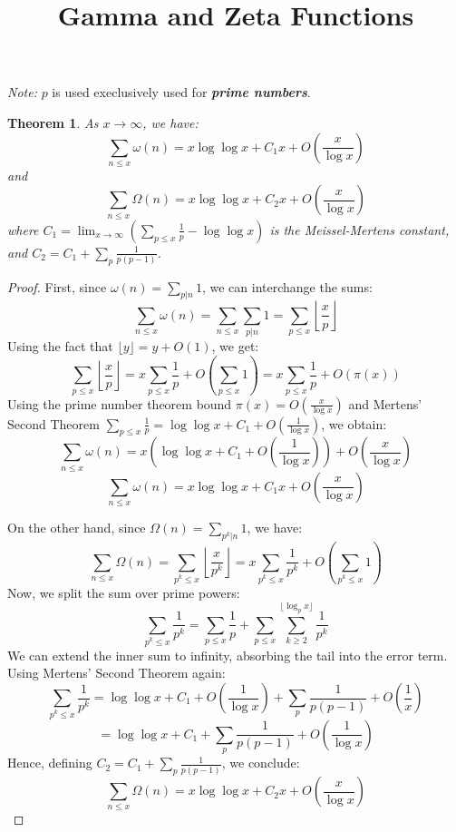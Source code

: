 \documentclass[a4paper,11pt]{article}
\title{Gamma and Zeta Functions}
\author{}
\date{}
\newtheorem{theorem}{Theorem}
\begin{document}
\maketitle

\textit{Note:} $p$ is used execlusively used for
\textit{\textbf{prime numbers}}.

\begin{theorem}
  As $x \to \infty$, we have:
  \[ \sum_{n \le x} \omega(n) = x \log \log x + C_1 x +
  O\left(\frac{x}{\log x}\right) \]
  and
  \[ \sum_{n \le x} \Omega(n) = x \log \log x + C_2 x +
  O\left(\frac{x}{\log x}\right) \]
  where $C_1 = \lim_{x \to \infty} \left( \sum_{p \le x} \frac{1}{p}
  - \log \log x \right)$ is the Meissel-Mertens constant, and $C_2 =
  C_1 + \sum_{p} \frac{1}{p(p-1)}$.
\end{theorem}

\begin{proof}
  First, since $\omega(n) = \sum_{p|n} 1$, we can interchange the sums:
  \[ \sum_{n \le x} \omega(n) = \sum_{n \le x} \sum_{p|n} 1 = \sum_{p
  \le x} \left\lfloor \frac{x}{p} \right\rfloor \]
  Using the fact that $\lfloor y \rfloor = y + O(1)$, we get:
  \[ \sum_{p \le x} \left\lfloor \frac{x}{p} \right\rfloor = x
    \sum_{p \le x} \frac{1}{p} + O\left(\sum_{p \le x} 1\right) = x
  \sum_{p \le x} \frac{1}{p} + O(\pi(x)) \]
  Using the prime number theorem bound $\pi(x) = O\left(\frac{x}{\log
  x}\right)$ and Mertens' Second Theorem $\sum_{p \le x} \frac{1}{p}
  = \log \log x + C_1 + O\left(\frac{1}{\log x}\right)$, we obtain:
  \[ \sum_{n \le x} \omega(n) = x \left( \log \log x + C_1 +
  O\left(\frac{1}{\log x}\right) \right) + O\left(\frac{x}{\log x}\right) \]
  \[ \sum_{n \le x} \omega(n) = x \log \log x + C_1 x +
  O\left(\frac{x}{\log x}\right) \]

  On the other hand, since $\Omega(n) = \sum_{p^k | n} 1$, we have:
  \[ \sum_{n \le x} \Omega(n) = \sum_{p^k \le x} \left\lfloor
    \frac{x}{p^k} \right\rfloor = x \sum_{p^k \le x} \frac{1}{p^k} +
  O\left(\sum_{p^k \le x} 1\right) \]
  Now, we split the sum over prime powers:
  \[ \sum_{p^k \le x} \frac{1}{p^k} = \sum_{p \le x} \frac{1}{p} +
  \sum_{p \le x} \sum_{k \ge 2}^{\lfloor \log_p x \rfloor} \frac{1}{p^k} \]
  We can extend the inner sum to infinity, absorbing the tail into
  the error term. Using Mertens' Second Theorem again:
  \[ \sum_{p^k \le x} \frac{1}{p^k} = \log \log x + C_1 +
    O\left(\frac{1}{\log x}\right) + \sum_{p} \frac{1}{p(p-1)} +
  O\left(\frac{1}{x}\right) \]
  \[ = \log \log x + C_1 + \sum_{p} \frac{1}{p(p-1)} +
  O\left(\frac{1}{\log x}\right) \]
  Hence, defining $C_2 = C_1 + \sum_{p} \frac{1}{p(p-1)}$, we conclude:
  \[ \sum_{n \le x} \Omega(n) = x \log \log x + C_2 x +
  O\left(\frac{x}{\log x}\right) \]
\end{proof}
\end{document}
